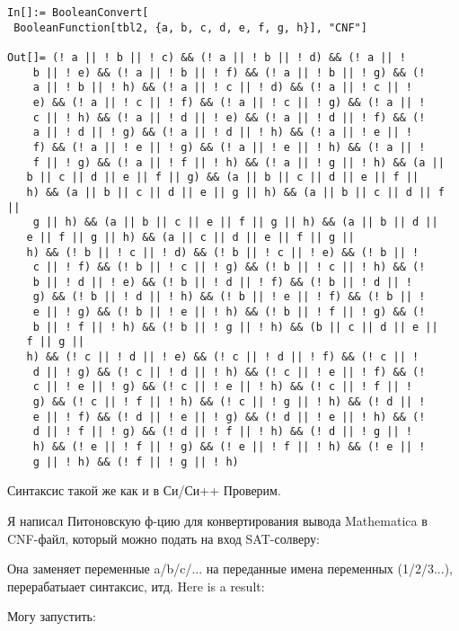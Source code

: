\begin{lstlisting}
In[]:= BooleanConvert[
 BooleanFunction[tbl2, {a, b, c, d, e, f, g, h}], "CNF"]

Out[]= (! a || ! b || ! c) && (! a || ! b || ! d) && (! a || ! 
    b || ! e) && (! a || ! b || ! f) && (! a || ! b || ! g) && (! 
    a || ! b || ! h) && (! a || ! c || ! d) && (! a || ! c || ! 
    e) && (! a || ! c || ! f) && (! a || ! c || ! g) && (! a || ! 
    c || ! h) && (! a || ! d || ! e) && (! a || ! d || ! f) && (! 
    a || ! d || ! g) && (! a || ! d || ! h) && (! a || ! e || ! 
    f) && (! a || ! e || ! g) && (! a || ! e || ! h) && (! a || ! 
    f || ! g) && (! a || ! f || ! h) && (! a || ! g || ! h) && (a || 
   b || c || d || e || f || g) && (a || b || c || d || e || f || 
   h) && (a || b || c || d || e || g || h) && (a || b || c || d || f ||
    g || h) && (a || b || c || e || f || g || h) && (a || b || d || 
   e || f || g || h) && (a || c || d || e || f || g || 
   h) && (! b || ! c || ! d) && (! b || ! c || ! e) && (! b || ! 
    c || ! f) && (! b || ! c || ! g) && (! b || ! c || ! h) && (! 
    b || ! d || ! e) && (! b || ! d || ! f) && (! b || ! d || ! 
    g) && (! b || ! d || ! h) && (! b || ! e || ! f) && (! b || ! 
    e || ! g) && (! b || ! e || ! h) && (! b || ! f || ! g) && (! 
    b || ! f || ! h) && (! b || ! g || ! h) && (b || c || d || e || 
   f || g || 
   h) && (! c || ! d || ! e) && (! c || ! d || ! f) && (! c || ! 
    d || ! g) && (! c || ! d || ! h) && (! c || ! e || ! f) && (! 
    c || ! e || ! g) && (! c || ! e || ! h) && (! c || ! f || ! 
    g) && (! c || ! f || ! h) && (! c || ! g || ! h) && (! d || ! 
    e || ! f) && (! d || ! e || ! g) && (! d || ! e || ! h) && (! 
    d || ! f || ! g) && (! d || ! f || ! h) && (! d || ! g || ! 
    h) && (! e || ! f || ! g) && (! e || ! f || ! h) && (! e || ! 
    g || ! h) && (! f || ! g || ! h)
\end{lstlisting}

Синтаксис такой же как и в Си/Си++
Проверим.

Я написал Питоновскую ф-цию для конвертирования вывода Mathematica в \ac{CNF}-файл, который можно подать на вход
SAT-солверу:



Она заменяет переменные a/b/c/... на переданные имена переменных (1/2/3...), перерабатыает синтаксис, итд.
Here is a result:



Могу запустить:

